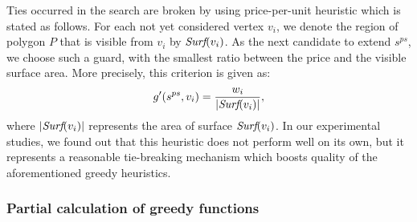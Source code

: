 \documentclass[runningheads,a4paper]{elsarticle}
\begin{document}
	
	Ties occurred in the search are broken by using  price-per-unit heuristic which is stated as follows.
	For each not yet considered vertex $v_i$, we denote the region of polygon $P$ that is visible from $v_i$ by $\emph{Surf}(v_i)$. As the next candidate to extend $s^{ps}$, we choose such a guard,  with the smallest ratio between the price and the visible surface area. More precisely, this  criterion is given as:
	\begin{align}
	g'(s^{ps}, v_i) = \frac{w_{i}}{|\emph{Surf}({v_i})|},
	\end{align}
    where $|\emph{Surf}({v_i})|$ represents the area of surface $\emph{Surf}({v_i})$. 
	In our experimental studies, we found out that this heuristic does not perform well on its own, but it represents a reasonable tie-breaking mechanism which boosts quality of the aforementioned greedy heuristics.
	\subsubsection{Partial calculation of greedy functions}
	
\end{document}
